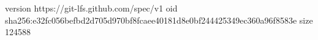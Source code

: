version https://git-lfs.github.com/spec/v1
oid sha256:e32fc056befbd2d705d970bf8fcaee40181d8e0bf244425349ec360a96f8583e
size 124588
